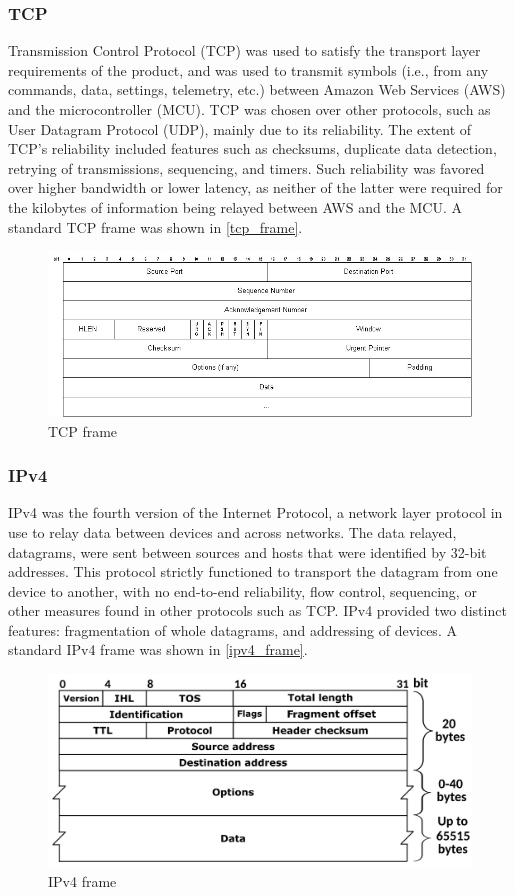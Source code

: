 \subsubsection{TCP} \label{tcp_standard} 
Transmission Control Protocol (TCP) was used to satisfy the transport layer requirements of the product, and was used to transmit symbols (i.e., from any commands, data, settings, telemetry, etc.) between Amazon Web Services (AWS) and the microcontroller (MCU). TCP was chosen over other protocols, such as User Datagram Protocol (UDP), mainly due to its reliability. The extent of TCP's reliability included features such as checksums, duplicate data detection, retrying of transmissions, sequencing, and timers. Such reliability was favored over higher bandwidth or lower latency, as neither of the latter were required for the kilobytes of information being relayed between AWS and the MCU. A standard TCP frame was shown in \autoref{tcp_frame}.
\begin{figure}[H]
    \caption{TCP frame \cite{Kristoff}}
    \label{tcp_frame}
    \centering
    \includegraphics[width=\textwidth]{images/tcp_frame.jpg}
\end{figure}

\subsubsection{IPv4} 
IPv4 was the fourth version of the Internet Protocol, a network layer protocol in use to relay data between devices and across networks. The data relayed, datagrams, were sent between sources and hosts that were identified by 32-bit addresses. This protocol strictly functioned to transport the datagram from one device to another, with no end-to-end reliability, flow control, sequencing, or other measures found in other protocols such as TCP. IPv4 provided two distinct features: fragmentation of whole datagrams, and addressing of devices. A standard IPv4 frame was shown in \autoref{ipv4_frame}.
\begin{figure}[H]
    \caption{IPv4 frame \cite{Postel1981}}
    \label{ipv4_frame}
    \centering
    \includegraphics[width=\textwidth]{images/ipv4_frame.png}
\end{figure}